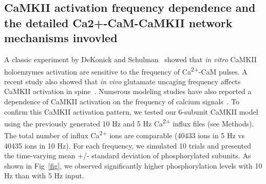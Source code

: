\documentclass[10pt,letterpaper]{article}
\begin{document}
\begin{comment}
\begin{figure}[!h]
	\caption{{\bf}
	A: Time courses of CaMKII subunits and CaM molecules when given 5 Hz Ca\textsuperscript{2+} influx generated from 16 channels. ‘camkii\_b’ means CaM bound CaMKII subunits. ‘camkii\_p’ means phosphorylated CaMKII subunits. ‘KN2C2 + KpNxC2’ represents CaM molecules bound to either CaMKII or phosphorylated CaMKII and are fully Ca\textsuperscript{2+} loaded on C sites. B: Time courses of phosphorylated CaMKII subunits for 10 Hz (smooth lines) and 5 Hz input (dashed lines) with the complete network, reaction scheme1 and reaction scheme2 respectively. C: Time courses of phosphorylated CaMKII subunits for 10 Hz(fast rising) and 5 Hz input (slow rising) when one holoenzyme contains 2, 6 and 12 subunits respectively. D: With 5 Hz input, time courses of molecule number for subunits that are activated themselves (bound or phosphorylated) and together their neighbors. E: The same as in D except that 10 Hz input is used.}
\label{fig4}
\end{figure}
\end{comment}

\subsection*{CaMKII activation frequency dependence and the detailed Ca2+-CaM-CaMKII network mechanisms invovled}

A classic experiment by DeKonick and Schulman~\cite{DeKoninck:1998wh} showed that \textit{in vitro} CaMKII holoenzymes activation are sensitive to the frequency of Ca\textsuperscript{2+}-CaM pulses. A recent study also showed that \textit{in vivo} glutamate uncaging frequency affects CaMKII activation in spine~\cite{Fujii:2013bg}. Numerous modeling studies have also reported a dependence of CaMKII activation on the frequency of calcium signals~\cite{}. To confirm this CaMKII activation pattern, we tested our 6-subunit CaMKII model using the previously generated 10 Hz and 5 Hz Ca\textsuperscript{2+} influx files (see Methods). The total number of influx Ca\textsuperscript{2+} ions are comparable (40433 ions in 5 Hz vs 40435 ions in 10 Hz). For each frequency, we simulated 10 trials and presented the time-varying mean +/- standard deviation of phosphorylated subunits. As shown in Fig~\ref{fig}, we observed significantly higher phosphorylation levels with 10 Hz than with 5 Hz input.
\end{document}
